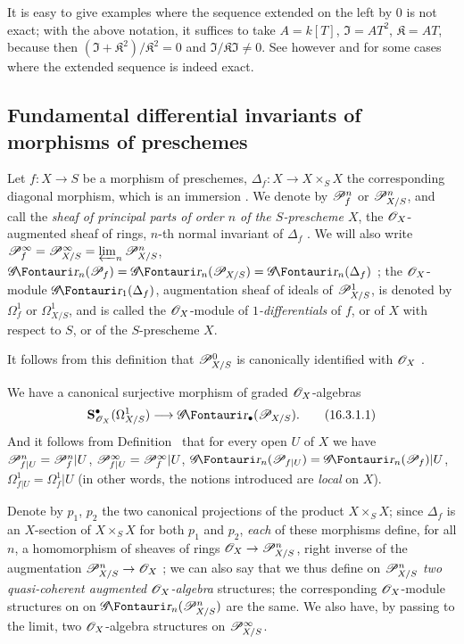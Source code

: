 It is easy to give examples where the sequence  extended on the left by $0$ is not exact;
with the above notation, it suffices to take $A = k[T]$, $\mathfrak{I} = AT^2$, $\mathfrak{K} = AT$, because then $(\mathfrak{I} + \mathfrak{K}^2)/\mathfrak{K}^2 = 0$ and $\mathfrak{I}/\mathfrak{K}\mathfrak{I} \neq 0$.
See however  and  for some cases where the extended sequence is indeed exact.

\subsection{Fundamental differential invariants of morphisms of preschemes}
\label{IV.16.3}

\begin{definition}[16.3.1]
\label{IV.16.3.1}
Let $f:X \to S$ be a morphism of preschemes, $\Delta_f: X \to X \times_S X$ the corresponding diagonal morphism, which is an immersion .
We denote by $\mathscr{P}_f^n$ or $\mathscr{P}_{X/S}^n$, and call the \emph{sheaf of principal parts of order $n$ of the $S$-prescheme $X$}, the $\mathscr{O}_X$-augmented sheaf of rings, $n$-th normal invariant of $\Delta_f$ .
We will also write $\mathscr{P}_f^\infty = \mathscr{P}_{X/S}^\infty = \varprojlim_n \mathscr{P}_{X/S}^n$, $\shGr_n(\sh{P}_f) = \shGr_n(\sh{P}_{X/S}) = \shGr_n(\Delta_f)$ ;
the $\mathscr{O}_X$-module $\shGr_1(\Delta_f)$, augmentation sheaf of ideals of $\mathscr{P}_{X/S}^1$, is denoted by $\Omega_f^1$ or $\Omega_{X/S}^1$, and is called the $\mathscr{O}_X$-module of \emph{$1$-differentials} of $f$, or of $X$ with respect to $S$, or of the $S$-prescheme $X$.
\end{definition}

It follows from this definition that $\mathscr{P}_{X/S}^0$ is canonically identified with $\mathscr{O}_X$ .

We have  a canonical surjective morphism of graded $\mathscr{O}_X$-algebras 
\[
  \label{IV.16.3.1.1}
  \bb{S}_{\sh{O}_X}^\bullet(\Omega_{X/S}^1) \to \shGr_\bullet(\sh{P}_{X/S}).
  \tag{16.3.1.1}
\]
And it follows from Definition~ that for every open $U$ of $X$ we have $\mathscr{P}_{f|U}^n = \mathscr{P}_f^n|U$, $\mathscr{P}_{f|U}^\infty = \mathscr{P}_f^\infty|U$, $\shGr_n(\sh{P}_{f|U}) = \shGr_n(\sh{P}_f)|U$, $\Omega_{f|U}^1 = \Omega_f^1|U$ (in other words, the notions introduced are \emph{local} on $X$).

\begin{env}[16.3.2]
\label{IV.16.3.2}
Denote by $p_1$, $p_2$ the two canonical projections of the product $X \times_S X$;
since $\Delta_f$ is an $X$-section of $X \times_S X$ for both $p_1$ and $p_2$, \emph{each} of these morphisms define, for all $n$, a homomorphism of sheaves of rings $\sh{O}_X \to \sh{P}_{X/S}^n$, right inverse of the augmentation $\sh{P}_{X/S}^n \to \sh{O}_X$ ;
we can also say that we thus define on $\mathscr{P}_{X/S}^n$ \emph{two} \emph{quasi-coherent augmented $\mathscr{O}_X$-algebra} structures;
the corresponding $\mathscr{O}_X$-module structures on on $\shGr_n(\sh{P}_{X/S}^n)$ are the same. 
We also have, by passing to the limit, two $\mathscr{O}_X$-algebra structures on $\mathscr{P}_{X/S}^\infty$.
\end{env}

